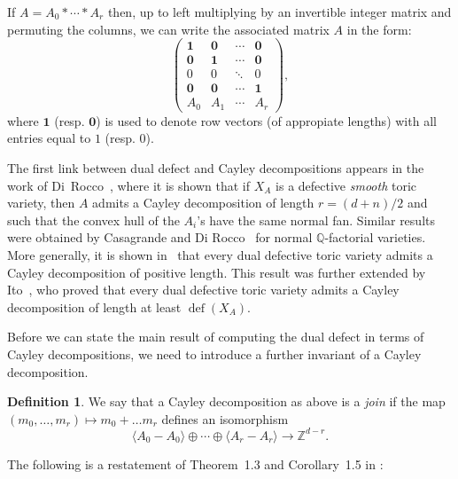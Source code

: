 \documentclass[11pt]{amsart}
\theoremstyle{plain}
\theoremstyle{definition}
\newtheorem{definition}[theorem]{Definition}
\theoremstyle{remark}
\newcommand{\defect}{{\operatorname {def}}}
\newcommand{\baseRing}[1]{\ensuremath{\mathbb{#1}}}
\newcommand{\Z}{\baseRing{Z}}
\newcommand{\Q}{\baseRing{Q}}
\numberwithin{equation}{section}
\begin{document}
If $A = A_0 \ast \cdots \ast A_r$ then, up to left multiplying by an invertible integer matrix and permuting the columns, we can write the associated matrix $A$ in the form:
\begin{equation}\label{eq:Cayley_matrix}
\left(\begin{array}{cccc}
{\mathbf 1} & {\mathbf 0} & \cdots & {\mathbf 0} \\
{\mathbf 0} & {\mathbf 1} & \cdots & {\mathbf 0} \\
0 & 0 & \ddots &0 \\
{\mathbf 0} & {\mathbf 0} & \cdots & {\mathbf 1} \\
A_0 & A_1 & \cdots & A_r
\end{array}\right),
\end{equation}
where ${\mathbf 1}$ (resp. ${\mathbf 0}$)  is used to denote row vectors (of appropiate lengths) with all entries equal to $1$ (resp. $0$).




The first link between dual defect and Cayley decompositions appears in the work of Di~Rocco~\cite{Di}, where it is shown that if $X_A$ is a defective 
{\em smooth} toric variety, then $A$ admits a Cayley decomposition of length $r = (d + n)/2$ and such that the convex hull of the $A_i$'s have the same normal fan.  
Similar results were obtained by Casagrande and Di Rocco~\cite{CDi} for normal $\Q$-factorial varieties.  More generally, it is shown in~\cite{CC,E1}
 that every dual defective toric variety admits a Cayley decomposition of positive length.  This result was further extended by Ito~\cite{I}, who proved that every dual defective
  toric variety admits a Cayley decomposition of length at least $\defect(X_A)$.  




Before we can state the main result of \cite{FI} computing the dual defect in terms of Cayley decompositions, 
we need to introduce a further invariant of a Cayley decomposition.

\begin{definition}\label{def:join}
We say that a Cayley decomposition as above is a {\em join}  
if the  map $(m_0, \dots, m_r) \mapsto m_0 + \dots m_r$  defines an isomorphism
$$\langle A_0 - A_0\rangle \oplus \cdots \oplus \langle A_r - A_r\rangle \to  \Z^{d-r}.$$
\end{definition}

The following is a restatement of Theorem~1.3 and Corollary~1.5 in \cite{FI}:
\end{document}
